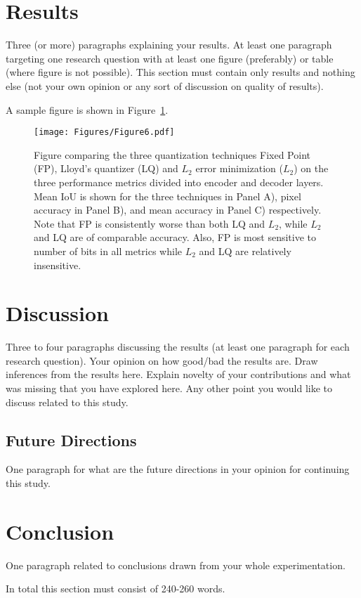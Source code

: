 \documentclass[conference]{IEEEtran}
\begin{document}
\section{Results}
Three (or more) paragraphs explaining your results. At least one paragraph targeting one research question with at least one figure (preferably) or table (where figure is not possible).
This section must contain only results and nothing else (not your own opinion or any sort of discussion on quality of results).

A sample figure is shown in Figure~\ref{Fig:Figure6}.

\begin{figure}[!ht]
\centering
\texttt{[image: Figures/Figure6.pdf]}
\caption{Figure comparing the three quantization techniques Fixed Point (FP), Lloyd's quantizer (LQ) and $L_2$ error minimization ($L_2$) on the three performance metrics divided into encoder and decoder layers. Mean IoU is shown for the three techniques in Panel A), pixel accuracy in Panel B), and mean accuracy in Panel C) respectively. Note that FP is consistently worse than both LQ and $L_2$, while $L_2$ and LQ are of comparable accuracy. Also, FP is most sensitive to number of bits in all metrics while $L_2$ and LQ are relatively insensitive.}
\label{Fig:Figure6}
\end{figure}

\section{Discussion}
Three to four paragraphs discussing the results (at least one paragraph for each research question).
Your opinion on how good/bad the results are. 
Draw inferences from the results here.
Explain novelty of your contributions and what was missing that you have explored here.
Any other point you would like to discuss related to this study.

\subsection{Future Directions}
One paragraph for what are the future directions in your opinion for continuing this study.

\section{Conclusion}
One paragraph related to conclusions drawn from your whole experimentation.

In total this section must consist of 240-260 words.



\end{document}
